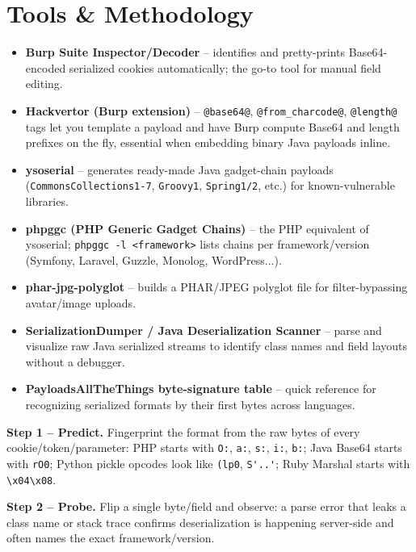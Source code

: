 \documentclass[11pt]{article}
\begin{document}
\section{Tools \& Methodology}
\begin{itemize}
    \item \textbf{Burp Suite Inspector/Decoder} -- identifies and pretty-prints Base64-encoded serialized cookies automatically; the go-to tool for manual field editing.
    \item \textbf{Hackvertor (Burp extension)} -- \verb|@base64@|, \verb|@from_charcode@|, \verb|@length@| tags let you template a payload and have Burp compute Base64 and length prefixes on the fly, essential when embedding binary Java payloads inline.
    \item \textbf{ysoserial} -- generates ready-made Java gadget-chain payloads (\texttt{CommonsCollections1-7}, \texttt{Groovy1}, \texttt{Spring1/2}, etc.) for known-vulnerable libraries.
    \item \textbf{phpggc (PHP Generic Gadget Chains)} -- the PHP equivalent of ysoserial; \verb|phpggc -l <framework>| lists chains per framework/version (Symfony, Laravel, Guzzle, Monolog, WordPress...).
    \item \textbf{phar-jpg-polyglot} -- builds a PHAR/JPEG polyglot file for filter-bypassing avatar/image uploads.
    \item \textbf{SerializationDumper / Java Deserialization Scanner} -- parse and visualize raw Java serialized streams to identify class names and field layouts without a debugger.
    \item \textbf{PayloadsAllTheThings byte-signature table} -- quick reference for recognizing serialized formats by their first bytes across languages.
\end{itemize}

\textbf{Step 1 -- Predict.} Fingerprint the format from the raw bytes of every cookie/token/parameter: PHP starts with \verb|O:|, \verb|a:|, \verb|s:|, \verb|i:|, \verb|b:|; Java Base64 starts with \texttt{rO0}; Python pickle opcodes look like \verb|(lp0|, \verb|S'..'|; Ruby Marshal starts with \verb|\x04\x08|.

\textbf{Step 2 -- Probe.} Flip a single byte/field and observe: a parse error that leaks a class name or stack trace confirms deserialization is happening server-side and often names the exact framework/version.
\end{document}
